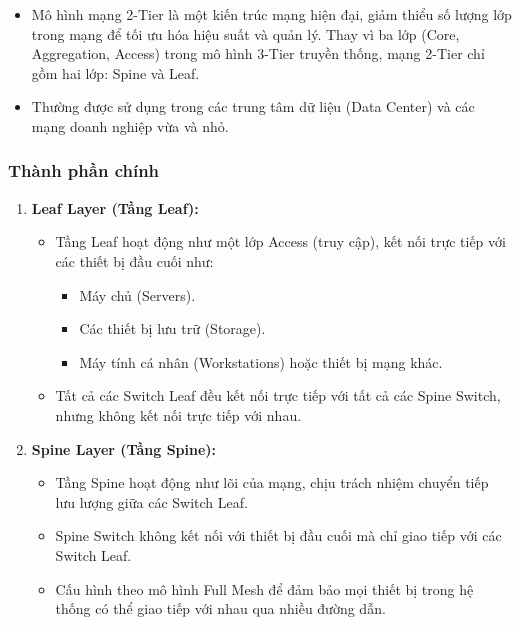 \documentclass[13pt]{article}
\begin{document}
\begin{itemize}
    \item Mô hình mạng 2-Tier là một kiến trúc mạng hiện đại, giảm thiểu số lượng lớp trong mạng để tối ưu hóa hiệu suất và quản lý. Thay vì ba lớp (Core, Aggregation, Access) trong mô hình 3-Tier truyền thống, mạng 2-Tier chỉ gồm hai lớp: Spine và Leaf.
    \item Thường được sử dụng trong các trung tâm dữ liệu (Data Center) và các mạng doanh nghiệp vừa và nhỏ.
\end{itemize}

\subsubsection{Thành phần chính}
\begin{enumerate}
    \item \textbf{Leaf Layer (Tầng Leaf):}
    \begin{itemize}
        \item Tầng Leaf hoạt động như một lớp Access (truy cập), kết nối trực tiếp với các thiết bị đầu cuối như:
        \begin{itemize}
            \item Máy chủ (Servers).
            \item Các thiết bị lưu trữ (Storage).
            \item Máy tính cá nhân (Workstations) hoặc thiết bị mạng khác.
        \end{itemize}
        \item Tất cả các Switch Leaf đều kết nối trực tiếp với tất cả các Spine Switch, nhưng không kết nối trực tiếp với nhau.
    \end{itemize}

    \item \textbf{Spine Layer (Tầng Spine):}
    \begin{itemize}
        \item Tầng Spine hoạt động như lõi của mạng, chịu trách nhiệm chuyển tiếp lưu lượng giữa các Switch Leaf.
        \item Spine Switch không kết nối với thiết bị đầu cuối mà chỉ giao tiếp với các Switch Leaf.
        \item Cấu hình theo mô hình Full Mesh để đảm bảo mọi thiết bị trong hệ thống có thể giao tiếp với nhau qua nhiều đường dẫn.
    \end{itemize}
\end{enumerate}
\end{document}
